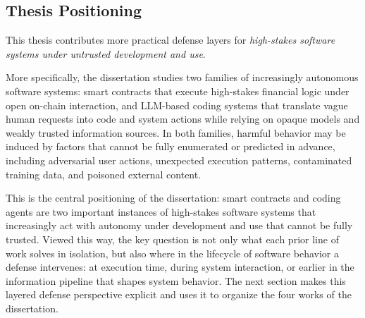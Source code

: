 \subsection{Thesis Positioning}

This thesis contributes more practical defense layers for
\emph{high-stakes software systems under untrusted development and use}.

More specifically, the dissertation studies two families of 
increasingly autonomous software systems:
smart contracts that execute high-stakes financial 
logic under open on-chain interaction,
and LLM-based coding systems that translate 
vague human requests into code and system actions 
while relying on opaque models and weakly trusted information sources.
In both families, harmful behavior may be induced by factors 
that cannot be fully enumerated or predicted in advance,
including adversarial user actions, unexpected execution patterns,
contaminated training data, and poisoned external content.

This is the central positioning of the dissertation:
smart contracts and coding agents are two important instances 
of high-stakes software systems
that increasingly act with autonomy under development and use
that cannot be fully trusted.
Viewed this way, the key question is not only what 
each prior line of work solves in isolation,
but also where in the lifecycle of software behavior 
a defense intervenes:
at execution time, during system interaction, 
or earlier in the information pipeline that 
shapes system behavior.
The next section makes this layered defense perspective explicit
and uses it to organize the four works of the dissertation.
